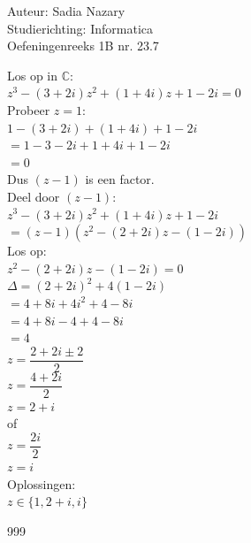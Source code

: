 \documentclass[a4paper]{article}
\begin{document}
  
\noindent \large Auteur: Sadia Nazary  \\
\noindent \large Studierichting: Informatica\\
\noindent \large Oefeningenreeks 1B nr. 23.7\\

\medskip

\normalsize

Los op in $\mathbb{C}$:\\

$z^3 - (3+2i)z^2 + (1+4i)z + 1 - 2i = 0$\\

Probeer $z = 1$:\\

$1 - (3+2i) + (1+4i) + 1 - 2i$\\

$= 1 -3 -2i +1 +4i +1 -2i$\\

$= 0$\\

Dus $(z-1)$ is een factor.\\

Deel door $(z-1)$:\\

$z^3 - (3+2i)z^2 + (1+4i)z + 1 - 2i$\\

$= (z-1)(z^2 -(2+2i)z -(1-2i))$\\

Los op:\\

$z^2 -(2+2i)z -(1-2i)=0$\\

$\Delta = (2+2i)^2 +4(1-2i)$\\

$= 4 +8i +4i^2 +4 -8i$\\

$= 4 +8i -4 +4 -8i$\\

$= 4$\\

$z = \dfrac{2+2i \pm 2}{2}$\\

$z = \dfrac{4+2i}{2}$\\

$z = 2+i$\\

of\\

$z = \dfrac{2i}{2}$\\

$z = i$\\


Oplossingen:\\

$z\in\{ 1, 2+i, i\}$

\begin{thebibliography}{999}
\end{thebibliography}
\end{document}
